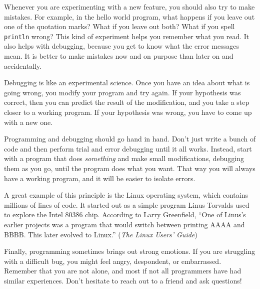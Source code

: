 \documentclass[12pt]{book}
\theoremstyle{exercise}
\newcommand{\java}[1]{\verb"#1"}
\newcommand{\java}[1]{\lstinline{#1}} %
\begin{document}
Whenever you are experimenting with a new feature, you should also try to make mistakes.
For example, in the hello world program, what happens if you leave out one of the quotation marks?
What if you leave out both?
What if you spell \java{println} wrong?
This kind of experiment helps you remember what you read.
It also helps with debugging, because you get to know what the error messages mean.
It is better to make mistakes now and on purpose than later on and accidentally.



Debugging is like an experimental science.
Once you have an idea about what is going wrong, you modify your program and try again.
If your hypothesis was correct, then you can predict the result of the modification, and you take a step closer to a working program.
If your hypothesis was wrong, you have to come up with a new one.

Programming and debugging should go hand in hand.
Don't just write a bunch of code and then perform trial and error debugging until it all works.
Instead, start with a program that does {\em something} and make small modifications, debugging them as you go, until the program does what you want.
That way you will always have a working program, and it will be easier to isolate errors.


A great example of this principle is the Linux operating system, which contains millions of lines of code.
It started out as a simple program Linus Torvalds used to explore the Intel 80386 chip.
According to Larry Greenfield, ``One of Linus's earlier projects was a program that would switch between printing AAAA and BBBB.
This later evolved to Linux.'' ({\em The Linux Users' Guide})


Finally, programming sometimes brings out strong emotions.
If you are struggling with a difficult bug, you might feel angry, despondent, or embarrassed.
Remember that you are not alone, and most if not all programmers have had similar experiences.
Don't hesitate to reach out to a friend and ask questions!
\end{document}
